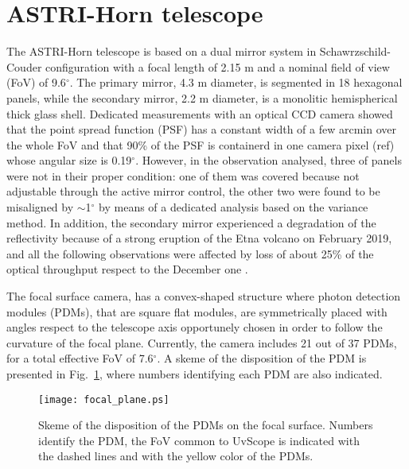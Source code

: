 \section{ASTRI-Horn telescope} 
The ASTRI-Horn telescope is based on a dual mirror system in Schawrzschild-Couder configuration
with a focal length of 2.15 m and a nominal field of view (FoV) of 9.6$^\circ$. 
The primary mirror, 4.3 m diameter, is segmented in 18 hexagonal panels, 
while the secondary mirror, 2.2 m diameter, is a monolitic hemispherical thick glass shell. 
Dedicated measurements  with an optical CCD camera showed that the
point spread function (PSF) has a constant width of a few arcmin
over the whole FoV and that  90\% of the PSF  is containerd in one camera pixel (ref)
whose angular size is 0.19$^\circ$. 
However, in the observation analysed, three of panels were not in their proper condition:
one of them was covered because not adjustable through the active mirror control, the other two were found to be misaligned by $\sim$1$^\circ$ by means of a dedicated analysis based on the variance method.
In addition, the secondary mirror experienced a degradation of the reflectivity because of a strong eruption of the Etna volcano on February 2019, and all the following observations were affected by loss of about 25\% of the optical throughput
respect to the December one \cite{Mineo2019}. 

The focal surface camera, has a convex-shaped structure where
photon detection modules (PDMs), that are square flat modules, are symmetrically placed
with angles respect to the telescope axis opportunely chosen in order to follow the curvature of the focal plane.
Currently, the camera includes 21 out of 37 PDMs, for a total effective FoV of 7.6$^\circ$.
A skeme of the disposition of the PDM is presented in Fig.~\ref{fig:camera}, where numbers identifying each PDM are also indicated. 
\begin{figure}
\texttt{[image: focal\_plane.ps]}
\caption{Skeme of the disposition of the PDMs on the focal surface. Numbers identify the PDM, the FoV common to UvScope is indicated with the dashed lines and with the yellow color of the PDMs.}
\label{fig:camera}
\end{figure}

